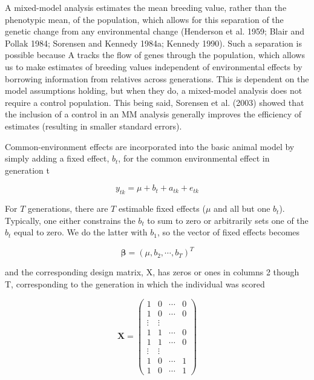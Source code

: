 \documentclass{article}
\begin{document}
A mixed-model analysis estimates the mean breeding value, rather than the phenotypic mean, of the population, which allows for this separation of the genetic change from any environmental change (Henderson et al. 1959; Blair and Pollak 1984; Sorensen and Kennedy 1984a; Kennedy 1990). Such a separation is possible because A tracks the flow of genes through the population, which allows us to make estimates of breeding values independent of environmental effects by borrowing information from relatives across generations. This is dependent on the model assumptions holding, but when they do, a mixed-model analysis does not require a control population. This being said, Sorensen et al. (2003) showed that the inclusion of a control in an MM analysis generally improves the efficiency of estimates (resulting in smaller standard errors).

Common-environment effects are incorporated into the basic animal model by simply adding a fixed effect,  $ b_{t} $, for the common environmental effect in generation t

\begin{equation}
y_{t k}=\mu+b_{t}+a_{t k}+e_{t k}
\tag{19.11}
\label{eq:19_11}
\end{equation}

For $T$ generations, there are $T$ estimable fixed effects ($\mu$ and all but one $b_t$). Typically, one either constrains the $b_t$ to sum to zero or arbitrarily sets one of the $b_t$ equal to zero. We do the latter with $b_1$, so the vector of fixed effects becomes

\begin{equation}
\boldsymbol{\beta}=(\mu,b_{2},\cdots,b_{T})^{T}
\end{equation}

and the corresponding design matrix, X, has zeros or ones in columns 2 though T, corresponding to the generation in which the individual was scored

\begin{equation}
\mathbf{X}=\begin{pmatrix}{{{1}}}&{{{0}}}&{{{\cdots}}}&{{{0}}} \\{{{1}}}&{{{0}}}&{{{\cdots}}}&{{{0}}} \\{{{\vdots}}}&{{{\vdots}}} \\{{{1}}}&{{{1}}}&{{{\cdots}}}&{{{0}}} \\{{{1}}}&{{{1}}}&{{{\cdots}}}&{{{0}}} \\{{{\vdots}}}&{{{\vdots}}} \\{{{1}}}&{{{0}}}&{{{\cdots}}}&{{{1}}} \\{{{1}}}&{{{0}}}&{{{\cdots}}}&{{{1}}}\end{pmatrix}
\end{equation}
\end{document}
